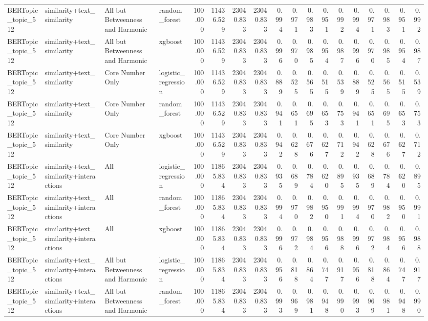 \begin{tabular}{llllrrrrrrrrrrrrrr}
BERTopic_topic_512 & similarity+text_similarity & All but Betweenness and Harmonic & random_forest & 100.000 & 11436.529 & 23040.833 & 23040.833 & 0.994 & 0.971 & 0.983 & 0.951 & 0.992 & 0.994 & 0.971 & 0.983 & 0.951 & 0.992 \\
BERTopic_topic_512 & similarity+text_similarity & All but Betweenness and Harmonic & xgboost & 100.000 & 11436.529 & 23040.833 & 23040.833 & 0.996 & 0.970 & 0.985 & 0.954 & 0.987 & 0.996 & 0.970 & 0.985 & 0.954 & 0.987 \\
BERTopic_topic_512 & similarity+text_similarity & Core Number Only & logistic_regression & 100.000 & 11436.529 & 23040.833 & 23040.833 & 0.889 & 0.525 & 0.565 & 0.515 & 0.539 & 0.889 & 0.525 & 0.565 & 0.515 & 0.539 \\
BERTopic_topic_512 & similarity+text_similarity & Core Number Only & random_forest & 100.000 & 11436.529 & 23040.833 & 23040.833 & 0.941 & 0.651 & 0.695 & 0.653 & 0.753 & 0.941 & 0.651 & 0.695 & 0.653 & 0.753 \\
BERTopic_topic_512 & similarity+text_similarity & Core Number Only & xgboost & 100.000 & 11436.529 & 23040.833 & 23040.833 & 0.942 & 0.628 & 0.676 & 0.627 & 0.712 & 0.942 & 0.628 & 0.676 & 0.627 & 0.712 \\
BERTopic_topic_512 & similarity+text_similarity+interactions & All & logistic_regression & 100.000 & 11865.834 & 23040.833 & 23040.833 & 0.935 & 0.689 & 0.784 & 0.620 & 0.895 & 0.935 & 0.689 & 0.784 & 0.620 & 0.895 \\
BERTopic_topic_512 & similarity+text_similarity+interactions & All & random_forest & 100.000 & 11865.834 & 23040.833 & 23040.833 & 0.994 & 0.970 & 0.982 & 0.950 & 0.991 & 0.994 & 0.970 & 0.982 & 0.950 & 0.991 \\
BERTopic_topic_512 & similarity+text_similarity+interactions & All & xgboost & 100.000 & 11865.834 & 23040.833 & 23040.833 & 0.996 & 0.972 & 0.984 & 0.956 & 0.988 & 0.996 & 0.972 & 0.984 & 0.956 & 0.988 \\
BERTopic_topic_512 & similarity+text_similarity+interactions & All but Betweenness and Harmonic & logistic_regression & 100.000 & 11865.834 & 23040.833 & 23040.833 & 0.956 & 0.818 & 0.864 & 0.747 & 0.917 & 0.956 & 0.818 & 0.864 & 0.747 & 0.917 \\
BERTopic_topic_512 & similarity+text_similarity+interactions & All but Betweenness and Harmonic & random_forest & 100.000 & 11865.834 & 23040.833 & 23040.833 & 0.993 & 0.969 & 0.981 & 0.948 & 0.990 & 0.993 & 0.969 & 0.981 & 0.948 & 0.990 \\

\end{tabular}
